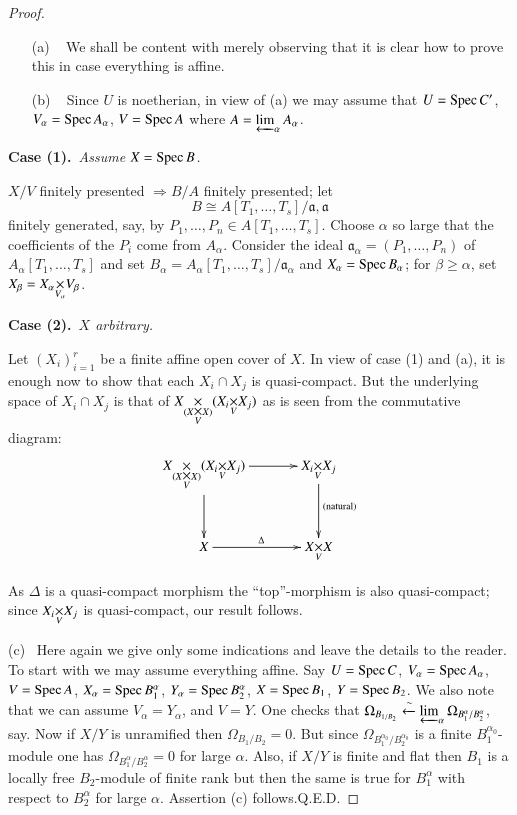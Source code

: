 \begin{proof}
\begin{itemize}
\item[(a)]~ We shall be content with merely observing that it is
clear how to prove this in case everything is affine.

\smallskip

\item[(b)]~ Since $U$ is noetherian, in view of (a) we may assume that
  $U=\operatorname{Spec} C'$, $V_{\alpha}=\operatorname{Spec} A_{\alpha}$, $V=\operatorname{Spec} A$ where
  $A=\varprojlim_{\alpha}A_{\alpha}$. 
\end{itemize}

\noindent
{\bf Case (1).}~{\em Assume $X=\operatorname{Spec} B$.}

$X/V$ finitely presented $\Rightarrow B/A$ finitely presented; let
$$
B\cong A[T_{1},\ldots,T_{s}]/\mathfrak{a}, \mathfrak{a}
$$ 
finitely
generated, say, by $P_{1},\ldots,P_{n}\in
A[T_{1},\ldots,T_{s}]$. Choose $\alpha$ so large that the coefficients
of the $P_{i}$ come from $A_{\alpha}$. Consider the ideal
$\mathfrak{a}_{\alpha}=(P_{1},\ldots,P_{n})$ of
$A_{\alpha}[T_{1},\ldots,T_{s}]$ and set
$B_{\alpha}=A_{\alpha}[T_{1},\ldots,T_{s}]/\mathfrak{a}_{\alpha}$ and
$X_{\alpha}=\operatorname{Spec} B_{\alpha}$; for $\beta\geq \alpha$, set
$X_{\beta}=\fprod{X_{\alpha}}{V_{\beta}}{V_{\alpha}}$. 

\medskip
\noindent
{\bf Case (2).}~{\em $X$ arbitrary.}

Let $(X_{i})^{r}_{i=1}$ be a finite affine open cover of $X$. In view
of case (1) and (a), it is enough now to show that each $X_{i}\cap
X_{j}$ is quasi-compact. But the underlying space of $X_{i}\cap X_{j}$
is that of $\fprod{X}{(\fprod{X_{i}}{X_{j}}{V})}{(\fprod{X}{X}{V})}$
as is seen from the commutative diagram:\pageoriginale
\[
\xymatrix@=1.2cm{
\fprod{X}{(\fprod{X_{i}}{X_{j}}{V})}{(\fprod{X}{X}{V})}\ar[r]\ar[d] &
\fprod{X_{i}}{X_{j}}{V}\ar[d]^{\text{(natural)}}\\
X\ar[r]^{\Delta} & \fprod{X}{X}{V}
}
\]

As $\Delta$ is a quasi-compact morphism the ``top''-morphism is also
\break quasi-compact; since $\fprod{X_{i}}{X_{j}}{V}$ is quasi-compact, our
result follows.

\smallskip

(c)~ Here again we give only some indications and leave the details to
the reader. To start with we may assume everything affine. Say
$U=\operatorname{Spec} C$, $V_{\alpha}=\operatorname{Spec} A_{\alpha}$, $V=\operatorname{Spec} A$,
$X_{\alpha}=\operatorname{Spec} B^{\alpha}_{1}$, $Y_{\alpha}=\operatorname{Spec} B^{\alpha}_{2}$,
$X=\operatorname{Spec} B_{1}$, $Y=\operatorname{Spec} B_{2}$. We also note that we can assume
$V_{\alpha}=Y_{\alpha}$, and $V=Y$. One checks that
$\Omega_{B_{1/B_{2}}}\xleftarrow{\sim}\varprojlim_{\alpha}\Omega_{B^{\alpha}_{1}/B^{\alpha}_{2}}$,
  say. Now if $X/Y$ is unramified then $\Omega_{B_{1}/B_{2}}=0$. 
But since $\Omega_{B_{1}^{\alpha_{0}}/B^{\alpha_{0}}_{2}}$ is a finite
$B^{\alpha_{0}}_{1}$-module one has
$\Omega_{B^{\alpha}_{1}/B^{\alpha}_{2}}=0$  for large $\alpha$. Also,
if $X/Y$ is finite and flat then $B_{1}$ is a locally free
$B_{2}$-module of finite rank but then the same is true for
$B^{\alpha}_{1}$ with respect to $B^{\alpha}_{2}$ for large
$\alpha$. Assertion (c) follows.\hfill Q.E.D.
\end{proof}

